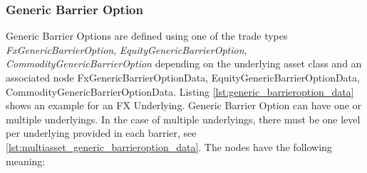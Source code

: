 \subsubsection{Generic Barrier Option}
\label{input:generic_barrieroption}

Generic Barrier Options are defined using one of the trade types \emph{FxGenericBarrierOption}, \emph{EquityGenericBarrierOption},
\emph{CommodityGenericBarrierOption} depending on the underlying asset class and an associated node FxGenericBarrierOptionData,
EquityGenericBarrierOptionData, CommodityGenericBarrierOptionData. Listing \ref{lst:generic_barrieroption_data} shows an
example for an FX Underlying. Generic Barrier Option can have one or multiple underlyings. In the case of multiple underlyings, there must be one level per underlying provided in each barrier, see \ref{lst:multiasset_generic_barrieroption_data}. The nodes have the following meaning:

